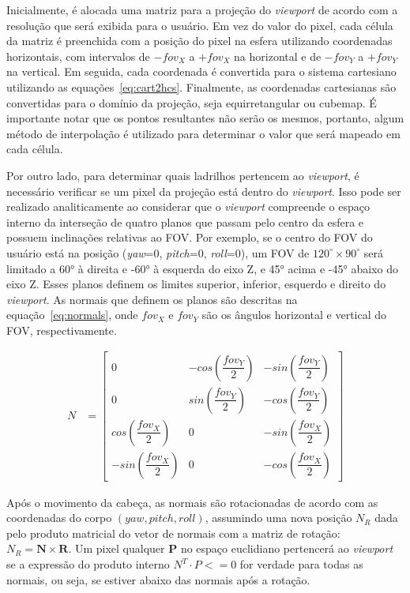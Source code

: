 Inicialmente, é alocada uma matriz para a projeção do \textit{viewport} de acordo com a resolução que será exibida para o usuário. Em vez do valor do pixel, cada célula da matriz é preenchida com a posição do pixel na esfera utilizando coordenadas horizontais, com intervalos de $-fov_X$ a $+fov_X$ na horizontal e de $-fov_Y$ a $+fov_Y$ na vertical. Em seguida, cada coordenada é convertida para o sistema cartesiano utilizando as equações~\ref{eq:cart2hcs}. Finalmente, as coordenadas cartesianas são convertidas para o domínio da projeção, seja equirretangular ou cubemap. É importante notar que os pontos resultantes não serão os mesmos, portanto, algum método de interpolação é utilizado para determinar o valor que será mapeado em cada célula.

Por outro lado, para determinar quais ladrilhos pertencem ao \textit{viewport}, é necessário verificar se um pixel da projeção está dentro do \textit{viewport}. Isso pode ser realizado analiticamente ao considerar que o \textit{viewport} compreende o espaço interno da interseção de quatro planos que passam pelo centro da esfera e possuem inclinações relativas ao FOV. Por exemplo, se o centro do FOV do usuário está na posição (\textit{yaw}=0, \textit{pitch}=0, \textit{roll}=0), um FOV de $120^\circ \times 90^\circ$ será limitado a 60° à direita e -60° à esquerda do eixo Z, e 45° acima e -45° abaixo do eixo Z. Esses planos definem os limites superior, inferior, esquerdo e direito do \textit{viewport}. As normais que definem os planos são descritas na equação~\ref{eq:normals}, onde $fov_X$ e $fov_Y$ são os ângulos horizontal e vertical do FOV, respectivamente.

\begin{align}
	N &=\begin{bmatrix}
		0 & -cos\left(\dfrac{fov_Y}{2}\right) & -sin\left(\dfrac{fov_Y}{2}\right) \\
		0 & sin\left(\dfrac{fov_Y}{2}\right) & -cos\left(\dfrac{fov_Y}{2}\right) \\
		cos\left(\dfrac{fov_X}{2}\right) & 0 & -sin\left(\dfrac{fov_X}{2}\right)\\
		-sin\left(\dfrac{fov_X}{2}\right) & 0 & -cos\left(\dfrac{fov_X}{2}\right)
	\end{bmatrix}
	\label{eq:normals}
\end{align}

Após o movimento da cabeça, as normais são rotacionadas de acordo com as coordenadas do corpo $(yaw, pitch, roll)$, assumindo uma nova posição $ N_R $ dada pelo produto matricial do vetor de normais com a matriz de rotação: $ N_R = \textbf{N} \times \textbf{R}$. Um pixel qualquer $ \textbf{P}$ no espaço euclidiano pertencerá ao \textit{viewport} se a expressão do produto interno $ N^T \cdot P <= 0 $ for verdade para todas as normais, ou seja, se estiver abaixo das normais após a rotação.

